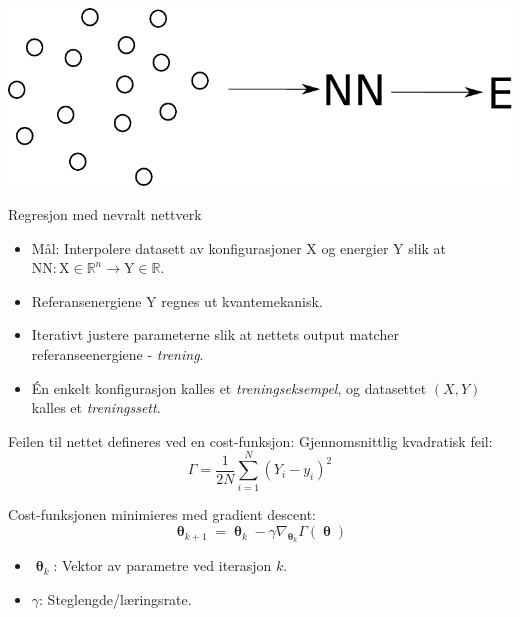 \documentclass{beamer}
\begin{document}
\begin{frame}
 
\centering
\includegraphics[width=0.8\linewidth]{../Figures/Presentation/interpolation.pdf}
\begin{block}{Regresjon med nevralt nettverk}
 \begin{itemize}
  \item Mål: Interpolere datasett av konfigurasjoner X og energier Y slik at
        $\mathrm{NN}: \mathrm{X} \in \mathbb{R}^n \rightarrow \mathrm{Y} \in \mathbb{R}$.
  \item Referansenergiene Y regnes ut kvantemekanisk. 
  \item Iterativt justere parameterne slik at nettets output matcher referanseenergiene - \textit{trening}.
  \item Én enkelt konfigurasjon kalles et \textit{treningseksempel}, og datasettet $(X,Y)$ kalles et \textit{treningssett}. 
 \end{itemize}
\end{block}

\end{frame}


\begin{frame}
 
\begin{block}{Feilen til nettet defineres ved en cost-funksjon:} 
 Gjennomsnittlig kvadratisk feil:
 \begin{equation*}
 \Gamma = \frac{1}{2N}\sum_{i=1}^N (Y_i - y_i)^2
 \end{equation*}
\end{block}

\begin{block}{Cost-funksjonen minimieres med gradient descent:}
 \begin{equation*}
  \boldsymbol{\uptheta}_{k+1} = \boldsymbol{\uptheta}_{k} - \gamma \nabla_{\boldsymbol{\uptheta}_k} \Gamma(\boldsymbol{\uptheta})
 \end{equation*}
 \begin{itemize}
  \item $\boldsymbol{\uptheta}_{k}$: Vektor av parametre ved iterasjon $k$. 
  \item $\gamma$: Steglengde/læringsrate. 
 \end{itemize}
\end{block}

\end{frame}
\end{document}
